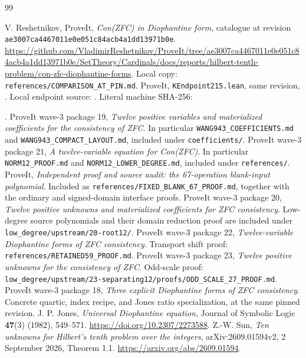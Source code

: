 \documentclass[11pt]{article}
\theoremstyle{remark}\newtheorem{remark}[theorem]{Remark}
\newcommand{\pin}{\texttt{ae3007ca4467011e0e051c84acb4a1dd13971b0e}}
\begin{document}
\begin{thebibliography}{99}
\raggedright
{} V. Reshetnikov, ProveIt, \emph{Con(ZFC) in Diophantine
form}, catalogue at revision \pin.
\url{https://github.com/VladimirReshetnikov/ProveIt/tree/ae3007ca4467011e0e051c84acb4a1dd13971b0e/SetTheory/Cardinals/docs/reports/hilbert-tenth-problem/con-zfc-diophantine-forms}.
Local copy: \texttt{references/COMPARISON\_AT\_PIN.md}.
 ProveIt, \texttt{KEndpoint215.lean}, same revision,
.
Local endpoint source: .
Literal machine SHA-256:\par
{}.
 ProveIt wave-3 package 19, \emph{Twelve positive variables
and materialized coefficients for the consistency of ZFC}. In particular
\texttt{WANG943\_COEFFICIENTS.md} and \texttt{WANG943\_COMPACT\_LAYOUT.md},
included under \texttt{coefficients/}.
 ProveIt wave-3 package 21, \emph{A twelve-variable equation
for Con(ZFC)}. In particular \texttt{NORM12\_PROOF.md} and
\texttt{NORM12\_LOWER\_DEGREE.md}, included under \texttt{references/}.
 ProveIt, \emph{Independent proof and source audit:
the 67-operation blank-input polynomial}. Included as
\texttt{references/FIXED\_BLANK\_67\_PROOF.md}, together with the ordinary
and signed-domain interface proofs.
 ProveIt wave-3 package 20, \emph{Twelve positive unknowns
and materialized coefficients for ZFC consistency}. Low-degree source
polynomials and their domain reduction proof are included under
\texttt{low\_degree/upstream/20-root12/}.
 ProveIt wave-3 package 22, \emph{Twelve-variable Diophantine
forms of ZFC consistency}. Transport shift proof:
\texttt{references/RETAINED59\_PROOF.md}.
 ProveIt wave-3 package 23, \emph{Twelve positive
unknowns for the consistency of ZFC}. Odd-scale proof:
\texttt{low\_degree/upstream/23-separating12/proofs/ODD\_SCALE\_27\_PROOF.md}.
 ProveIt wave-3 package 18, \emph{Three explicit Diophantine
forms of ZFC consistency}. Concrete quartic, index recipe, and Jones ratio
specialization, at the same pinned revision.
 J. P. Jones, \emph{Universal Diophantine equation},
Journal of Symbolic Logic \textbf{47}(3) (1982), 549--571.
\url{https://doi.org/10.2307/2273588}.
 Z.-W. Sun, \emph{Ten unknowns for Hilbert's tenth problem
over the integers}, arXiv:2609.01594v2, 2 September 2026, Theorem 1.1.
\url{https://arxiv.org/abs/2609.01594}.
\end{thebibliography}
\end{document}
